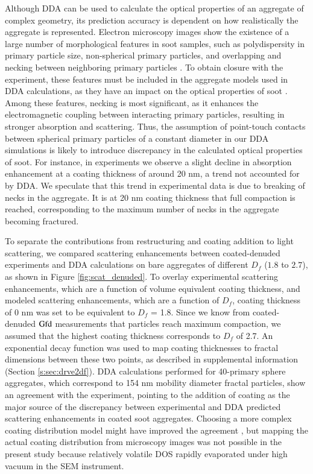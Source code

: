 Although DDA can be used to calculate the optical properties of an aggregate of complex geometry, its prediction accuracy is dependent on how realistically the aggregate is represented. Electron microscopy images show the existence of a large number of morphological features in soot samples, such as polydispersity in primary particle size, non-spherical primary particles, and overlapping and necking between neighboring primary particles \citep{RN24,RN28}. To obtain closure with the experiment, these features must be included in the aggregate models used in DDA calculations, as they have an impact on the optical properties of soot \citep{teng2019accounting}. Among these features, necking is most significant, as it enhances the electromagnetic coupling between interacting primary particles, resulting in stronger absorption and scattering. Thus, the assumption of point-touch contacts between spherical primary particles of a constant diameter in our DDA simulations is likely to introduce discrepancy in the calculated optical properties of soot. For instance, in experiments we observe a slight decline in absorption enhancement at a coating thickness of around 20 nm, a trend not accounted for by DDA. We speculate that this trend in experimental data is due to breaking of necks in the aggregate. It is at 20 nm coating thickness that full compaction is reached, corresponding to the maximum number of necks in the aggregate becoming fractured.

To separate the contributions from restructuring and coating addition to light scattering, we compared scattering enhancements between coated-denuded experiments and DDA calculations on bare aggregates of different $D_f$ ($1.8$ to $2.7$), as shown in Figure \ref{fig:scat_denuded}. To overlay experimental scattering enhancements, which are a function of volume equivalent coating thickness, and modeled scattering enhancements, which are a function of $D_f$, coating thickness of 0 nm was set to be equivalent to $D_f$ = 1.8. Since we know from coated-denuded $\rm Gfd$ measurements that particles reach maximum compaction, we assumed that the highest coating thickness corresponds to $D_f$ of 2.7. An exponential decay function was used to map coating thicknesses to fractal dimensions between these two points, as described in supplemental information (Section \ref{s:sec:drve2df}). DDA calculations performed for 40-primary sphere aggregates, which correspond to 154 nm mobility diameter fractal particles, show an agreement with the experiment, pointing to the addition of coating as the major source of the discrepancy between experimental and DDA predicted scattering enhancements in coated soot aggregates. Choosing a more complex coating distribution model might have improved the agreement \citep{luo2019optical}, but mapping the actual coating distribution from microscopy images was not possible in the present study because relatively volatile DOS rapidly evaporated under high vacuum in the SEM instrument.


